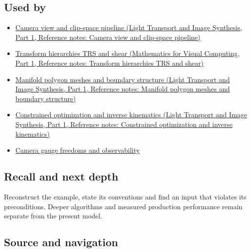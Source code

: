 \subsection{Used by}\label{appendix-1bae9457dbc3-used-by}

\hypertarget{appendix-1bae9457dbc3-used-by}{}

\begin{itemize}
\item
  \href{../04-Light-Transport-and-Image-Synthesis-P01/main.pdf\#appendix-1c07d64f5e70}{Camera view and clip-space pipeline (Light Transport and Image Synthesis, Part 1, Reference notes: Camera view and clip-space pipeline)}
\item
  \href{../02-Mathematics-for-Visual-Computing-P01/main.pdf\#appendix-292c061cd47c}{Transform hierarchies TRS and shear (Mathematics for Visual Computing, Part 1, Reference notes: Transform hierarchies TRS and shear)}
\item
  \href{../04-Light-Transport-and-Image-Synthesis-P01/main.pdf\#appendix-fab348609369}{Manifold polygon meshes and boundary structure (Light Transport and Image Synthesis, Part 1, Reference notes: Manifold polygon meshes and boundary structure)}
\item
  \href{../04-Light-Transport-and-Image-Synthesis-P01/main.pdf\#appendix-29f4bea4c2bb}{Constrained optimization and inverse kinematics (Light Transport and Image Synthesis, Part 1, Reference notes: Constrained optimization and inverse kinematics)}
\item
  \hyperref[appendix-113f0267e5f4]{Camera gauge freedoms and observability}
\end{itemize}

\subsection{Recall and next depth}\label{appendix-1bae9457dbc3-recall-and-next-depth}

\hypertarget{appendix-1bae9457dbc3-recall-and-next-depth}{}

Reconstruct the example, state its conventions and find an input that violates its preconditions. Deeper algorithms and measured production performance remain separate from the present model.

\subsection{Source and navigation}\label{appendix-1bae9457dbc3-source-and-navigation}

